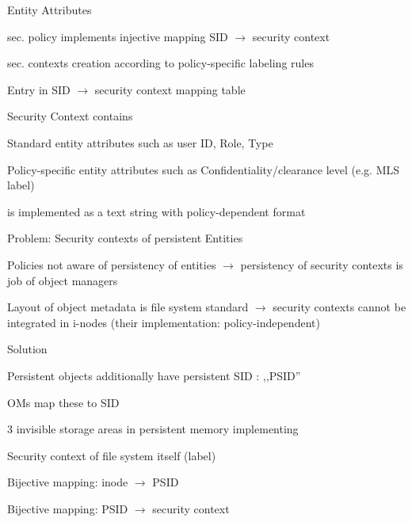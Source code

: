 \documentclass[a4paper]{article}
\begin{document}
\begin{multicols}{3}
    Entity Attributes
    \begin{itemize*}
        \item sec. policy implements injective mapping SID $\rightarrow$ security context
        \item sec. contexts creation according to policy-specific labeling rules
        \item Entry in SID $\rightarrow$ security context mapping table
    \end{itemize*}

    Security Context contains
    \begin{itemize*}
        \item Standard entity attributes such as user ID, Role, Type
        \item Policy-specific entity attributes such as Confidentiality/clearance level (e.g. MLS label)
        \item is implemented as a text string with policy-dependent format
    \end{itemize*}

    Problem: Security contexts of persistent Entities
    \begin{itemize*}
        \item Policies not aware of persistency of entities $\rightarrow$ persistency of security contexts is job of object managers
        \item Layout of object metadata is file system standard $\rightarrow$ security contexts cannot be integrated in i-nodes (their implementation: policy-independent)
    \end{itemize*}

    Solution
    \begin{itemize*}
        \item Persistent objects additionally have persistent SID : ,,PSID''
        \item OMs map these to SID
        \item 3 invisible storage areas in persistent memory implementing
        \begin{itemize*}
            \item Security context of file system itself (label)
            \item Bijective mapping: inode $\rightarrow$ PSID
            \item Bijective mapping: PSID $\rightarrow$ security context
        \end{itemize*}
    \end{itemize*}


\end{multicols}
\end{document}
